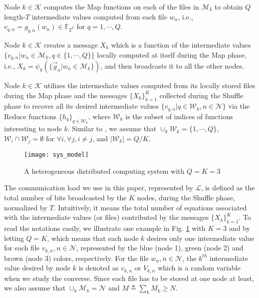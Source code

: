\documentclass[conference]{IEEEtran}
\begin{document}
  Node $k\in\mathcal{K}$ computes the Map functions on each of the files in $\mathcal{M}_k$ to obtain $Q$ length-$T$ intermediate values computed from each file $w_n$, i.e., $v_{q,n} = g_{q,n}(w_n) \in \mathbb{F}_{2^T}$ for $q=1,\cdots,Q$.

 Node $k\in\mathcal{K}$ creates a message $X_k$ which is a function of the intermediate values $\{v_{q,n}|w_n\!\in\!\mathcal{M}_k,q\!\in\!\{1,\cdots,Q\}\}$ locally computed at itself during the Map phase, i.e., $X_k={\psi}_k(\{{\overrightarrow{g}_n}|w_n \in {\mathcal M}_k\})$, and then broadcasts it to all the other nodes.

 Node $k\in\mathcal{K}$ utilizes the intermediate values computed from its locally stored files during the Map phase %
and the messages $\{X_k\}_{k=1}^K$ collected during the Shuffle phase to recover all its desired intermediate values $\{v_{q,n}|q\!\in\!\mathcal{W}_k,n\!\in\!\mathcal{N}\}$
via the Reduce functions $\{h_q\}_{q\in\mathcal{W}_k}$, where $\mathcal{W}_k$ is the subset of indices of functions interesting to node $k$. Similar to \cite{Avestimehr_CDC}, we assume that $\cup_k \mathcal{W}_k=\{1,\cdots,Q\}$, $\mathcal{W}_i\cap\mathcal{W}_j=\emptyset$ for $\forall i,\forall j,i\neq j$, and $|\mathcal{W}_k|=Q/K$.

\begin{figure}[!t] \centering %
\texttt{[image: sys\_model]}%
\caption{A heterogeneous distributed computing system with $Q\!=\!K\!=\!3$}\label{fig:sys_model}%
\end{figure}

The communication load we use in this paper, represented by ${\mathcal L}$, is defined as the total number of bits broadcasted by the $K$ nodes, during the Shuffle phase, normalized by $T$. Intuitively, it means the total number of equations associated with the intermediate values (or files) contributed by the messages $\{X_k\}_{k=1}^K$. To read the notations easily, we illustrate one example in Fig. \ref{fig:sys_model} with $K=3$ and by letting $Q=K$, which means that each node $k$ desires only one intermediate value for each file $v_{k,n},n\in\mathcal{N}$, represented by the blue (node 1), green (node 2) and brown (node 3) colors, respectively. For the file $w_n,n\in\mathcal{N}$, the $k^{th}$ intermediate value desired by node $k$ is denoted as $v_{k,n}$ or $V_{k,n}$ which is a random variable when we study the converse. Since each file has to be stored at one node at least, we also assume that $\cup_k \mathcal{M}_k= \mathcal{N}$ and $M\triangleq \sum_{k}M_k\!\geq\! N$.
\end{document}
